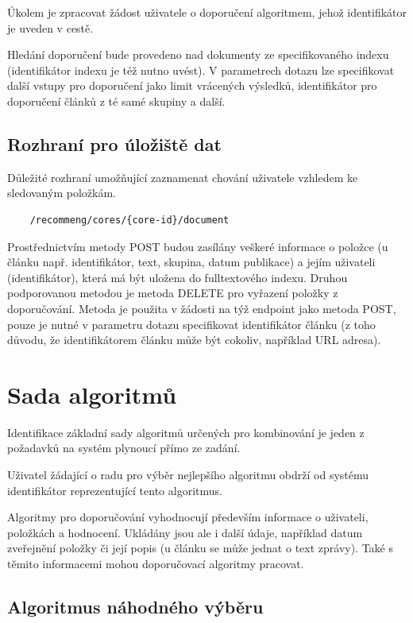 \documentclass[thesis=M,czech]{FITthesis}[2014/05/07]
\begin{document}
Úkolem je zpracovat žádost uživatele o doporučení algoritmem, jehož identifikátor je uveden v cestě. 

Hledání doporučení bude provedeno nad dokumenty ze specifikovaného indexu (identifikátor indexu je též nutno uvést). V parametrech dotazu lze specifikovat další vstupy pro doporučení jako limit vrácených výsledků, identifikátor pro doporučení článků z té samé skupiny a další.

\subsection{Rozhraní pro úložiště dat}

Důležité rozhraní umožňující zaznamenat chování uživatele vzhledem ke sledovaným položkám.

\begin{verbatim}
	/recommeng/cores/{core-id}/document
\end{verbatim}

Prostřednictvím metody POST budou zasílány veškeré informace o položce (u článku např. identifikátor, text, skupina, datum publikace) a jejím uživateli (identifikátor), která má být uložena do fulltextového indexu. Druhou podporovanou metodou je metoda DELETE pro vyřazení položky z doporučování. Metoda je použita v žádosti na týž endpoint jako metoda POST, pouze je nutné v parametru dotazu specifikovat identifikátor článku (z toho důvodu, že identifikátorem článku může být cokoliv, například URL adresa).
			
\section{Sada algoritmů}

Identifikace základní sady algoritmů určených pro kombinování je jeden z požadavků na systém plynoucí přímo ze zadání. 

Uživatel žádající o radu pro výběr nejlepšího algoritmu obdrží od systému identifikátor reprezentující tento algoritmus. 

Algoritmy pro doporučování vyhodnocují především informace o uživateli, položkách a hodnocení. Ukládány jsou ale i další údaje, například datum zveřejnění položky či její popis (u článku se může jednat o text zprávy). Také s těmito informacemi mohou doporučovací algoritmy pracovat. 

\subsection{Algoritmus náhodného výběru}
\end{document}
